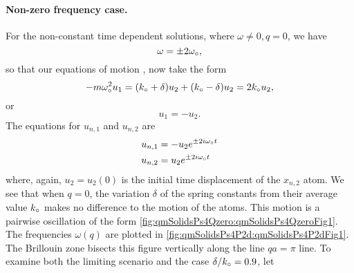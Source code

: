 {\paragraph{Non-zero frequency case.}
%
For the non-constant time dependent solutions, where \(\omega \ne 0, q = 0\), we have
%
\begin{equation}\label{eqn:condensedMatterProblemSet4Problem2:560}
\omega = \pm 2 \omega_\circ,
\end{equation}
%
so that our equations of motion , now take the form
%
\begin{dmath}\label{eqn:condensedMatterProblemSet4Problem2:640}
-m \omega_\nought^2 u_1
=
(k_\nought + \delta)
u_2
+ (k_\nought - \delta)
u_2
=
2 k_\nought
u_2,
\end{dmath}
%
or
%
\begin{equation}\label{eqn:condensedMatterProblemSet4Problem2:660}
u_1 = -u_2.
\end{equation}
%
The equations for \(u_{n, 1}\) and \(u_{n, 2}\) are
%
\begin{equation}\label{eqn:condensedMatterProblemSet4Problem2:600}
\begin{aligned}
u_{n, 1} &= -u_2 e^{ \pm 2 i \omega_\circ t } \\
u_{n, 2} &= u_2 e^{ \pm 2 i \omega_\circ t }
\end{aligned}
\end{equation}
%
where, again, \(u_2 = u_2(0)\) is the initial time displacement of the \(x_{n, 2}\) atom.  We see that when \(q = 0\), the variation \(\delta\) of the spring constants from their average value \(k_\circ\) makes no difference to the motion of the atoms.  This motion is a pairwise oscillation of the form \cref{fig:qmSolidsPs4Qzero:qmSolidsPs4QzeroFig1}.
The frequencies \(\omega(q)\) are plotted in \cref{fig:qmSolidsPs4P2d:qmSolidsPs4P2dFig1}.  The Brillouin zone bisects this figure vertically along the line \(q a = \pi\) line.
%
To examine both the limiting scenario and the case \(\delta/k_\circ = 0.9\), let
%
\begin{equation}\label{eqn:condensedMatterProblemSet4Problem2:740}

\end{equation}}
